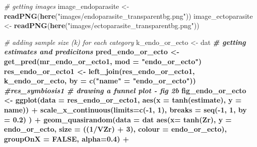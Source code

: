 \documentclass[
]{article}
\newenvironment{Shaded}{\begin{snugshade}}{\end{snugshade}}
\newcommand{\CommentTok}[1]{\textcolor[rgb]{0.56,0.35,0.01}{\textit{#1}}}
\newcommand{\DataTypeTok}[1]{\textcolor[rgb]{0.13,0.29,0.53}{#1}}
\newcommand{\DecValTok}[1]{\textcolor[rgb]{0.00,0.00,0.81}{#1}}
\newcommand{\FloatTok}[1]{\textcolor[rgb]{0.00,0.00,0.81}{#1}}
\newcommand{\KeywordTok}[1]{\textcolor[rgb]{0.13,0.29,0.53}{\textbf{#1}}}
\newcommand{\NormalTok}[1]{#1}
\newcommand{\OperatorTok}[1]{\textcolor[rgb]{0.81,0.36,0.00}{\textbf{#1}}}
\newcommand{\OtherTok}[1]{\textcolor[rgb]{0.56,0.35,0.01}{#1}}
\newcommand{\StringTok}[1]{\textcolor[rgb]{0.31,0.60,0.02}{#1}}
\begin{document}
\begin{Shaded}
\begin{Highlighting}[]
\CommentTok{# getting images}
\NormalTok{image_endoparasite <-}\StringTok{ }\KeywordTok{readPNG}\NormalTok{(}\KeywordTok{here}\NormalTok{(}\StringTok{"images/endoparasite_transparentbg.png"}\NormalTok{))}
\NormalTok{image_ectoparasite <-}\StringTok{ }\KeywordTok{readPNG}\NormalTok{(}\KeywordTok{here}\NormalTok{(}\StringTok{"images/ectoparasite_transparentbg.png"}\NormalTok{))}

\CommentTok{# adding sample size (k) for each category}
\NormalTok{k_endo_or_ecto <-}\StringTok{ }\NormalTok{dat }\OperatorTok{%
\CommentTok{# getting estimates and predicitons}
\NormalTok{pred_endo_or_ecto <-}\StringTok{ }\KeywordTok{get_pred}\NormalTok{(mr_endo_or_ecto1, }\DataTypeTok{mod =} \StringTok{"endo_or_ecto"}\NormalTok{) }
\NormalTok{res_endo_or_ecto1 <-}\StringTok{ }\KeywordTok{left_join}\NormalTok{(res_endo_or_ecto1, k_endo_or_ecto, }\DataTypeTok{by =}  \KeywordTok{c}\NormalTok{(}\StringTok{"name"}\NormalTok{ =}\StringTok{ "endo_or_ecto"}\NormalTok{))  }\OperatorTok{%
\CommentTok{#res_symbiosis1 }
\CommentTok{# drawing a funnel plot - fig 2b}
\NormalTok{fig_endo_or_ecto <-}\StringTok{ }\KeywordTok{ggplot}\NormalTok{(}\DataTypeTok{data =}\NormalTok{ res_endo_or_ecto1, }\KeywordTok{aes}\NormalTok{(}\DataTypeTok{x =} \KeywordTok{tanh}\NormalTok{(estimate), }\DataTypeTok{y =}\NormalTok{ name)) }\OperatorTok{+}
\StringTok{  }\KeywordTok{scale_x_continuous}\NormalTok{(}\DataTypeTok{limits=}\KeywordTok{c}\NormalTok{(}\OperatorTok{-}\DecValTok{1}\NormalTok{, }\DecValTok{1}\NormalTok{), }\DataTypeTok{breaks =} \KeywordTok{seq}\NormalTok{(}\OperatorTok{-}\DecValTok{1}\NormalTok{, }\DecValTok{1}\NormalTok{, }\DataTypeTok{by =} \FloatTok{0.2}\NormalTok{) ) }\OperatorTok{+}
\StringTok{  }\KeywordTok{geom_quasirandom}\NormalTok{(}\DataTypeTok{data =}\NormalTok{ dat }\OperatorTok{%
                   \KeywordTok{aes}\NormalTok{(}\DataTypeTok{x=} \KeywordTok{tanh}\NormalTok{(Zr), }\DataTypeTok{y =}\NormalTok{ endo_or_ecto, }\DataTypeTok{size =}\NormalTok{ ((}\DecValTok{1}\OperatorTok{/}\NormalTok{VZr) }\OperatorTok{+}\StringTok{ }\DecValTok{3}\NormalTok{), }\DataTypeTok{colour =}\NormalTok{ endo_or_ecto), }\DataTypeTok{groupOnX =} \OtherTok{FALSE}\NormalTok{, }\DataTypeTok{alpha=}\FloatTok{0.4}\NormalTok{) }\OperatorTok{+}\StringTok{ }
}}}
\end{Highlighting}
\end{Shaded}
\end{document}
